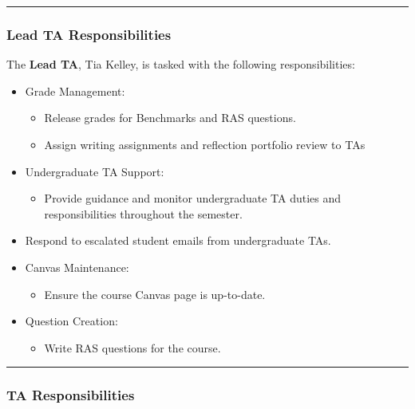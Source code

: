 \documentclass[
]{article}
\providecommand{\tightlist}{%
  \setlength{\itemsep}{0pt}\setlength{\parskip}{0pt}}
\begin{document}
\begin{center}\rule{0.5\linewidth}{0.5pt}\end{center}

\hypertarget{lead-ta-responsibilities}{%
\subsubsection{Lead TA Responsibilities}\label{lead-ta-responsibilities}}

The \textbf{Lead TA}, Tia Kelley, is tasked with the following responsibilities:

\begin{itemize}
\tightlist
\item
  Grade Management:

  \begin{itemize}
  \tightlist
  \item
    Release grades for Benchmarks and RAS questions.
  \item
    Assign writing assignments and reflection portfolio review to TAs
  \end{itemize}
\item
  Undergraduate TA Support:

  \begin{itemize}
  \tightlist
  \item
    Provide guidance and monitor undergraduate TA duties and responsibilities throughout the semester.
  \end{itemize}
\item
  Respond to escalated student emails from undergraduate TAs.
\item
  Canvas Maintenance:

  \begin{itemize}
  \tightlist
  \item
    Ensure the course Canvas page is up-to-date.
  \end{itemize}
\item
  Question Creation:

  \begin{itemize}
  \tightlist
  \item
    Write RAS questions for the course.
  \end{itemize}
\end{itemize}

\begin{center}\rule{0.5\linewidth}{0.5pt}\end{center}

\hypertarget{ta-responsibilities}{%
\subsubsection{TA Responsibilities}\label{ta-responsibilities}}
\end{document}
